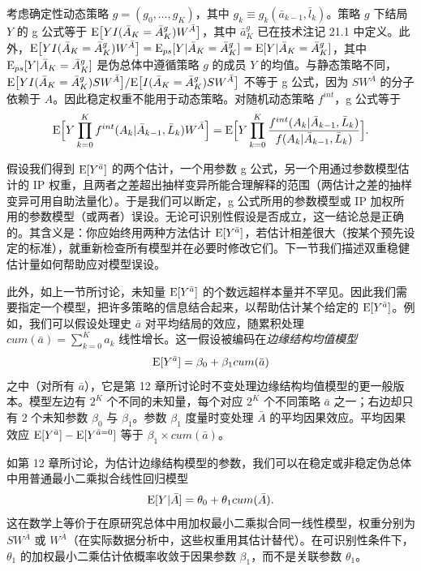 \begin{techpoint}[动态处理策略的 IP 加权]
考虑确定性动态策略 $g=(g_0,\dots,g_K)$，其中 $g_k\equiv g_k(\bar a_{k-1},\bar l_k)$。策略 $g$ 下结局 $Y$ 的 g 公式等于 $\mathrm{E}\big[YI(\bar A_K=\bar A_K^g)W^{\bar A}\big]$，其中 $\bar a_K^g$ 已在技术注记 21.1 中定义。此外，$\mathrm{E}\big[YI(\bar A_K=\bar A_K^g)W^{\bar A}\big]=\mathrm{E}_{ps}[Y|\bar A_K=\bar A_K^g]=\mathrm{E}[Y|\bar A_K=\bar A_K^g]$，其中 $\mathrm{E}_{ps}[Y|\bar A_K=\bar A_K^g]$ 是伪总体中遵循策略 $g$ 的成员 $Y$ 的均值。与静态策略不同，$\mathrm{E}\big[YI(\bar A_K=\bar A_K^g)SW^{\bar A}\big]/\allowbreak\mathrm{E}\big[I(\bar A_K=\bar A_K^g)SW^{\bar A}\big]$ 不等于 g 公式，因为 $SW^{\bar A}$ 的分子依赖于 $A$。因此稳定权重不能用于动态策略。对随机动态策略 $f^{int}$，g 公式等于
\[
\mathrm{E}\Big[Y\prod_{k=0}^{K}f^{int}(A_k|\bar A_{k-1},\bar L_k)W^{\bar A}\Big]=\mathrm{E}\Big[Y\prod_{k=0}^{K}\frac{f^{int}(A_k|\bar A_{k-1},\bar L_k)}{f(A_k|\bar A_{k-1},\bar L_k)}\Big].
\]
\end{techpoint}

假设我们得到 $\mathrm{E}[Y^{\bar a}]$ 的两个估计，一个用参数 g 公式，另一个用通过参数模型估计的 IP 权重，且两者之差超出抽样变异所能合理解释的范围（两估计之差的抽样变异可用自助法量化）。于是我们可以断定，g 公式所用的参数模型或 IP 加权所用的参数模型（或两者）误设。无论可识别性假设是否成立，这一结论总是正确的。其含义是：你应始终用两种方法估计 $\mathrm{E}[Y^{\bar a}]$，若估计相差很大（按某个预先设定的标准），就重新检查所有模型并在必要时修改它们。下一节我们描述双重稳健估计量如何帮助应对模型误设。


此外，如上一节所讨论，未知量 $\mathrm{E}[Y^{\bar a}]$ 的个数远超样本量并不罕见。因此我们需要指定一个模型，把许多策略的信息结合起来，以帮助估计某个给定的 $\mathrm{E}[Y^{\bar a}]$。例如，我们可以假设处理史 $\bar a$ 对平均结局的效应，随累积处理 $cum(\bar a)=\sum_{k=0}^{K}a_k$ 线性增长。这一假设被编码在\emph{边缘结构均值模型}
\[
\mathrm{E}[Y^{\bar a}]=\beta_0+\beta_1cum(\bar a)
\]
之中（对所有 $\bar a$），它是第 12 章所讨论时不变处理边缘结构均值模型的更一般版本。模型左边有 $2^K$ 个不同的未知量，每个对应 $2^K$ 个不同策略 $\bar a$ 之一；右边却只有 2 个未知参数 $\beta_0$ 与 $\beta_1$。参数 $\beta_1$ 度量时变处理 $\bar A$ 的平均因果效应。平均因果效应 $\mathrm{E}[Y^{\bar a}]-\mathrm{E}[Y^{\bar a=0}]$ 等于 $\beta_1\times cum(\bar a)$。


如第 12 章所讨论，为估计边缘结构模型的参数，我们可以在稳定或非稳定伪总体中用普通最小二乘拟合线性回归模型
\[
\mathrm{E}[Y|\bar A]=\theta_0+\theta_1cum(\bar A).
\]
这在数学上等价于在原研究总体中用加权最小二乘拟合同一线性模型，权重分别为 $SW^{\bar A}$ 或 $W^{\bar A}$（在实际数据分析中，这些权重用其估计替代）。在可识别性条件下，$\theta_1$ 的加权最小二乘估计依概率收敛于因果参数 $\beta_1$，而不是关联参数 $\theta_1$。

